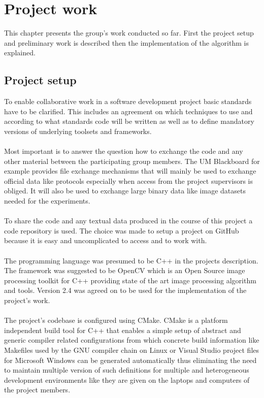\documentclass[%
   final,      %
   paper=a4,%
   paper=portrait, %
   pagesize=auto, %
   fontsize=10pt,%
   version=last, %
 ]{scrartcl} %
\begin{document}
\section{Project work}\label{sec:projectwork}
This chapter presents the group’s work conducted so far. First the project setup and preliminary work is described then the implementation of the algorithm is explained.

\subsection{Project setup}

To enable collaborative work in a software development project basic standards have to be clarified. This includes an agreement on which techniques to use and according to what standards code will be written as well as to define mandatory versions of underlying toolsets and frameworks.
\\
\\
Most important is to answer the question how to exchange the code and any other material between the participating group members. The UM Blackboard for example provides file exchange mechanisms that will mainly be used to exchange official data like protocols especially when access from the project supervisors is obliged. It will also be used to exchange large binary data like image datasets needed for the experiments.
\\
\\
To share the code and any textual data produced in the course of this project a code repository is used. The choice was made to setup a project on GitHub because it is easy and uncomplicated to access and to work with.
\\
\\
The programming language was presumed to be C++ in the projects description. The framework was suggested to be OpenCV which is an Open Source image processing toolkit for C++ providing state of the art image processing algorithm and tools. Version 2.4 was agreed on to be used for the implementation of the project’s work.
\\
\\
The project's codebase is configured using CMake. CMake is a platform independent build tool for C++ that enables a simple setup of abstract and generic compiler related configurations from which concrete build information like Makefiles used by the GNU compiler chain on Linux or Visual Studio project files for Microsoft Windows can be generated automatically thus eliminating the need to maintain multiple version of such definitions for multiple and heterogeneous development environments like they are given on the laptops and computers of the project members.
\end{document}
